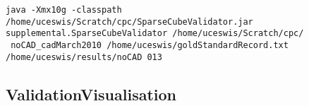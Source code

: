 \documentclass[11pt]{article} %
\begin{document}
\begin{lstlisting}
java -Xmx10g -classpath /home/uceswis/Scratch/cpc/SparseCubeValidator.jar 
supplemental.SparseCubeValidator /home/uceswis/Scratch/cpc/
 noCAD_cadMarch2010 /home/uceswis/goldStandardRecord.txt 
/home/uceswis/results/noCAD 013 
\end{lstlisting}


\subsection{ValidationVisualisation}
\end{document}
